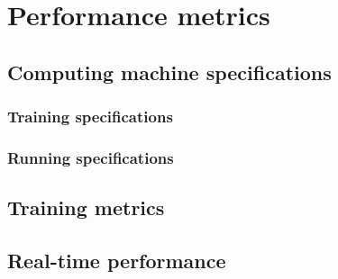\chapter{Performance metrics}
\label{chap:ch6}

\section{Computing machine specifications}
\label{sec:ch6sec1}

\subsection{Training specifications}
\label{sec:ch6sec1subsec1}

\subsection{Running specifications}
\label{sec:ch6sec1subsec2}

\section{Training metrics}
\label{sec:ch6sec2}

\section{Real-time performance}
\label{sec:ch6sec3}
